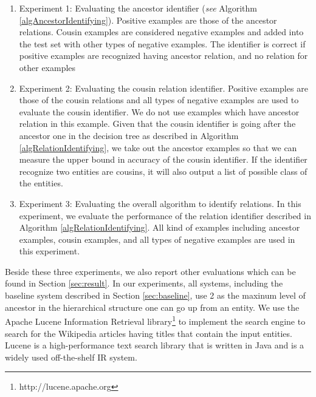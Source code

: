 \begin{enumerate}
\item Experiment 1: Evaluating the ancestor identifier ({\em see} Algorithm \ref{algAncestorIdentifying}). Positive examples are those of the ancestor relations. Cousin examples are considered negative examples and added into the test set with other types of negative examples. The identifier is correct if positive examples are recognized having ancestor relation, and no relation for other examples  
\item Experiment 2: Evaluating the cousin relation identifier. Positive examples are those of the cousin relations and all types of negative examples are used to evaluate the cousin identifier. We do not use examples which have ancestor relation in this example. Given that the cousin identifier is going after the ancestor one in the decision tree as described in Algorithm \ref{algRelationIdentifying}, we take out the ancestor examples so that we can measure the upper bound in accuracy of the cousin identifier.
If the identifier recognize two entities are cousins, it will also output a list of possible class of the entities.   


\item Experiment 3: Evaluating the overall algorithm to identify relations. In this experiment, we evaluate the performance of the relation identifier described in Algorithm \ref{algRelationIdentifying}. All kind of examples including ancestor examples, cousin examples, and all types of negative examples are used in this experiment.

\end{enumerate}

Beside these three experiments, we also report other evaluations which can be found in Section \ref{sec:result}.
In our experiments, all systems, including the baseline system described in Section \ref{sec:baseline}, use 2 as the maxinum level of ancestor in the hierarchical structure one can go up from an entity.
We use the Apache Lucene Information Retrieval library\footnote{http://lucene.apache.org} to implement the search engine to search for the Wikipedia articles having titles that contain the input entities. Lucene is a high-performance text search library that is written in Java and is a widely used off-the-shelf IR system.


